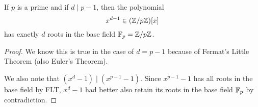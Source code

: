 \begin{proposition}[4.1.2 of text]\label{prop:d-roots}
    If $p$ is a prime and if $d\mid p-1$, then the polynomial
    \[x^{d-1}\in (\mathbb Z/p\mathbb Z)[x]\] has exactly $d$ roots in the base field $\mathbb F_p = \mathbb Z/p\mathbb Z$.
\end{proposition}
\begin{proof}
    We know this is true in the case of $d = p-1$ because of Fermat's Little Theorem (also Euler's Theorem).

    We also note that $(x^d - 1)\mid (x^{p-1} - 1)$. Since $x^{p-1} - 1$ has all roots in the base field by FLT, $x^d - 1$ had better also retain its roots in the base field $\mathbb F_p$ by contradiction.
\end{proof}